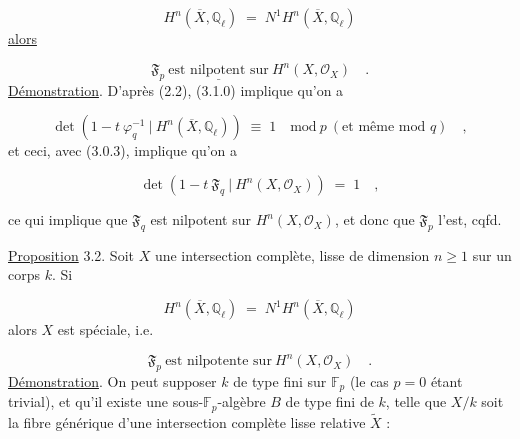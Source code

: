 \begin{equation}\tag{3.1.0}
H^n(\overline{X},\mathbb{Q}_\ell) \;=\; N^1H^n(\overline{X},\mathbb{Q}_\ell)
\end{equation}
\underline{alors}

\begin{equation}\tag{3.1.1}
\mathfrak{F}_p\ \underline{\text{est nilpotent sur}}\ H^n(X,\mathcal{O}_X) \quad .
\end{equation}
\underline{Démonstration}. D'après (2.2), (3.1.0) implique qu'on a

\begin{equation}\tag{3.1.2}
\det(1-t\ \varphi_q^{-1}\ |\ H^n(\overline{X},\mathbb{Q}_\ell)) \;\equiv\; 1 \quad \mathrm{mod}\ p\ (\text{et même mod } q) \quad ,
\end{equation}
et ceci, avec (3.0.3), implique qu'on a

\begin{equation}\tag{3.1.3}
\det(1-t\ \mathfrak{F}_q\ |\ H^n(X,\mathcal{O}_X)) \;=\; 1 \quad , 
\end{equation}


 ce qui implique que $\mathfrak{F}_q$ est nilpotent sur $H^n(X,\mathcal{O}_X)$, et donc que $\mathfrak{F}_p$ l'est, cqfd.

\underline{Proposition} 3.2. Soit $X$ une intersection complète, lisse de dimension $n \geq 1$ sur un corps $k$. Si

\begin{equation}\tag{3.2.1}
H^n(\overline{X},\mathbb{Q}_\ell) \;=\; N^1H^n(\overline{X},\mathbb{Q}_\ell)
\end{equation}
alors $X$ est spéciale, i.e.

\begin{equation}\tag{3.2.2}
\mathfrak{F}_p\ \text{est nilpotente sur}\ H^n(X,\mathcal{O}_X) \quad .
\end{equation}
\underline{Démonstration}. On peut supposer $k$ de type fini sur $\mathbb{F}_p$ (le cas $p = 0$ étant trivial), et qu'il existe une sous-$\mathbb{F}_p$-algèbre $B$ de type fini de $k$, telle que $X/k$ soit la fibre générique d'une intersection complète lisse relative $\widetilde{X}$ :


